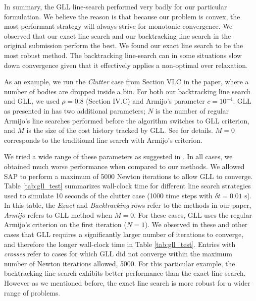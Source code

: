 In summary, the GLL line-search performed very badly for our particular
formulation. We believe the reason is that because our problem is convex, the most
performant strategy will always strive for monotonic convergence. We observed that
our exact line search and our backtracking line search in the original
submission perform the best. We found our exact line search to be the most robust
method. The backtracking line-search can in some situations slow down
convergence given that it effectively applies a non-optimal over relaxation.

As an example, we run the \emph{Clutter} case from Section VI.C in the paper,
where a number of bodies are dropped inside a bin. For both our backtracking
line search and GLL, we used $\rho=0.8$ (Section IV.C) and Armijo's parameter
$c=10^{-4}$. GLL as presented in \cite{bib:grippo1986nonmonotone} has two
additional parameters; $N$ is the number of regular Armijo's line searches
performed before the algorithm switches to GLL criterion, and $M$ is the size of the cost
history tracked by GLL. See \cite{bib:grippo1986nonmonotone} for details. $M=0$
corresponds to the traditional line search with Armijo's criterion. 

We tried a wide range of these parameters as suggested in
\cite{bib:grippo1986nonmonotone}. In all cases, we obtained much worse
performance when compared to our methods. We allowed SAP to perform a maximum of
5000 Newton iterations to allow GLL to converge. Table
\ref{tab:gll_test} summarizes wall-clock time for different line search
strategies used to simulate 10 seconds of the clutter case (1000 time steps with
$\delta t = 0.01\text{~s}$). In this table, the \emph{Exact} and
\emph{Backtracking} rows refer to the methods in our paper, \emph{Armijo} refers
to GLL method when $M=0$. For these cases, GLL uses the regular Armijo's criterion
on the first iteration ($N=1$). We observed in these and other cases that GLL
requires a significantly larger number of iterations to converge, and therefore
the longer wall-clock time in Table \ref{tab:gll_test}. Entries with
\emph{crosses} refer to cases for which GLL did not converge within the maximum
number of Newton iterations allowed, 5000. For this particular example, the
backtracking line search exhibits better performance than the exact line search.
However as we mentioned before, the exact line search is more robust for a wider
range of problems.

